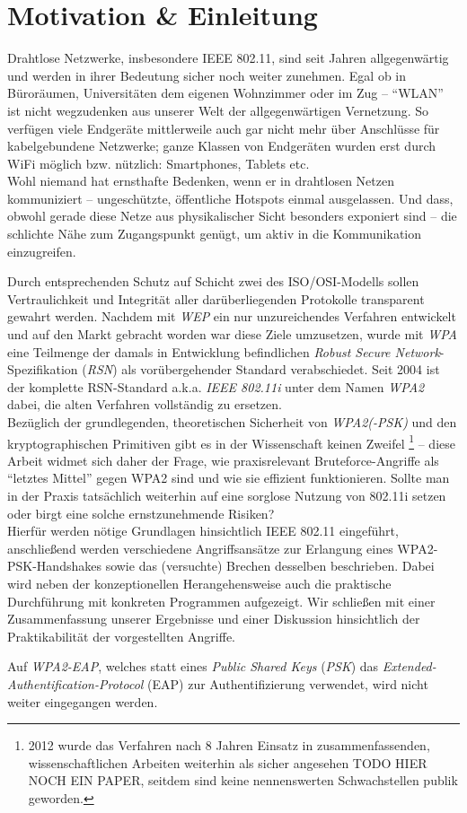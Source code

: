 \section{Motivation \& Einleitung}
Drahtlose Netzwerke, insbesondere IEEE 802.11, sind seit Jahren allgegenwärtig und werden in ihrer Bedeutung sicher noch weiter zunehmen. Egal ob in Büroräumen, Universitäten dem eigenen Wohnzimmer oder im Zug -- \enquote{WLAN} ist nicht wegzudenken aus unserer Welt der allgegenwärtigen Vernetzung. So verfügen viele Endgeräte mittlerweile auch gar nicht mehr über Anschlüsse für kabelgebundene Netzwerke; ganze Klassen von Endgeräten wurden erst durch WiFi möglich bzw. nützlich: Smartphones, Tablets etc.\\

Wohl niemand hat ernsthafte Bedenken, wenn er in drahtlosen Netzen kommuniziert -- ungeschützte, öffentliche Hotspots einmal ausgelassen. Und dass, obwohl gerade diese Netze aus physikalischer Sicht besonders exponiert sind -- die schlichte Nähe zum Zugangspunkt genügt, um aktiv in die Kommunikation einzugreifen.

Durch entsprechenden Schutz auf Schicht zwei des ISO/OSI-Modells sollen Vertraulichkeit und Integrität aller darüberliegenden Protokolle transparent gewahrt werden.
Nachdem mit \textit{WEP} ein nur unzureichendes Verfahren entwickelt und auf den Markt gebracht worden war diese Ziele umzusetzen, wurde mit \textit{WPA} eine Teilmenge der damals in Entwicklung befindlichen \textit{Robust Secure Network}-Spezifikation (\textit{RSN}) als vorübergehender Standard verabschiedet. Seit 2004 ist der komplette RSN-Standard a.k.a. \textit{IEEE 802.11i} unter dem Namen \textit{WPA2} dabei, die alten Verfahren vollständig zu ersetzen.\\

Bezüglich der grundlegenden, theoretischen Sicherheit von \textit{WPA2(-PSK)} und den kryptographischen Primitiven gibt es in der Wissenschaft keinen Zweifel \footnote{2012 wurde das Verfahren nach 8 Jahren Einsatz in zusammenfassenden, wissenschaftlichen Arbeiten weiterhin als sicher angesehen \cite{kumkar2012} TODO HIER NOCH EIN PAPER, seitdem sind keine nennenswerten Schwachstellen publik geworden.} -- diese Arbeit widmet sich daher der Frage, wie praxisrelevant Bruteforce-Angriffe als \enquote{letztes Mittel} gegen WPA2 sind und wie sie effizient funktionieren. Sollte man in der Praxis tatsächlich weiterhin auf eine sorglose Nutzung von 802.11i setzen oder birgt eine solche ernstzunehmende Risiken?\\

Hierfür werden nötige Grundlagen hinsichtlich IEEE 802.11 eingeführt, anschließend werden verschiedene Angriffsansätze zur Erlangung eines WPA2-PSK-Handshakes sowie das (versuchte) Brechen desselben beschrieben. Dabei wird neben der konzeptionellen Herangehensweise auch die praktische Durchführung mit konkreten Programmen aufgezeigt. Wir schließen mit einer Zusammenfassung unserer Ergebnisse und einer Diskussion hinsichtlich der Praktikabilität der vorgestellten Angriffe.

Auf \textit{WPA2-EAP}, welches statt eines \textit{Public Shared Keys} (\textit{PSK}) das \textit{Extended-Authentification-Protocol} (EAP) zur Authentifizierung verwendet, wird nicht weiter eingegangen werden.
